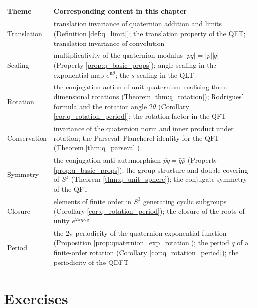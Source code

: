 \begingroup
\renewcommand{\arraystretch}{1.3}
\begin{longtable}{>{\raggedright\arraybackslash}p{3cm}>{\raggedright\arraybackslash}p{10.5cm}}
\toprule
Theme & Corresponding content in this chapter \\
\midrule
Translation & translation invariance of quaternion addition and limits (Definition \ref{def:q_limit}); the translation property of the QFT; translation invariance of convolution \\
Scaling & multiplicativity of the quaternion modulus $|pq|=|p||q|$ (Property \ref{prop:q_basic_props}); angle scaling in the exponential map $e^{\mathbf{u}\theta}$; the $s$ scaling in the QLT \\
Rotation & the conjugation action of unit quaternions realising three-dimensional rotations (Theorem \ref{thm:q_rotation}); Rodrigues' formula and the rotation angle $2\theta$ (Corollary \ref{cor:q_rotation_period}); the rotation factor in the QFT \\
Conservation & invariance of the quaternion norm and inner product under rotation; the Parseval--Plancherel identity for the QFT (Theorem \ref{thm:q_parseval}) \\
Symmetry & the conjugation anti-automorphism $\overline{pq}=\bar q\bar p$ (Property \ref{prop:q_basic_props}); the group structure and double covering of $S^3$ (Theorem \ref{thm:q_unit_sphere}); the conjugate symmetry of the QFT \\
Closure & elements of finite order in $S^3$ generating cyclic subgroups (Corollary \ref{cor:q_rotation_period}); the closure of the roots of unity $e^{2\pi i p/q}$ \\
Period & the $2\pi$-periodicity of the quaternion exponential function (Proposition \ref{prop:quaternion_exp_rotation}); the period $q$ of a finite-order rotation (Corollary \ref{cor:q_rotation_period}); the periodicity of the QDFT \\
\bottomrule
\end{longtable}
\endgroup

\section*{Exercises}

